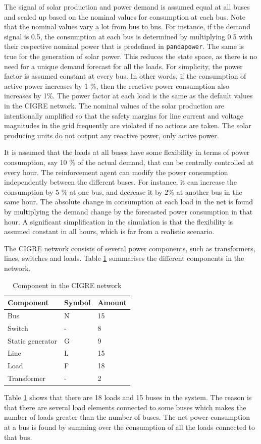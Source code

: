 \documentclass[class=book, crop=false, 11pt]{standalone}
\begin{document}
The signal of solar production and power demand is assumed equal at all buses and scaled up based on the nominal values for consumption at each bus. Note that the nominal values vary a lot from bus to bus. For instance, if the demand signal is 0.5, the consumption at each bus is determined by multiplying 0.5 with their respective nominal power that is predefined in \texttt{pandapower}. The same is true for the generation of solar power. This reduces the state space, as there is no need for a unique demand forecast for all the loads.  For simplicity, the power factor is assumed constant at every bus. In other words, if the consumption of active power increases by 1 \%, then the reactive power consumption also increases by 1\%. The power factor at each load is the same as the default values in the CIGRE network. The nominal values of the solar production are intentionally amplified so that the safety margins for line current and voltage magnitudes in the grid frequently are violated if no actions are taken. The solar producing units do not output any reactive power, only active power.

It is assumed that the loads at all buses have some flexibility in terms of power consumption, say 10 \% of the actual demand, that can be centrally controlled at every hour. The reinforcement agent can modify the power consumption independently between the different buses. For instance, it can increase the consumption by 5 \% at one bus, and decrease it by 2\% at another bus in the same hour. The absolute change in consumption at each load in the net is found by multiplying the demand change by the forecasted power consumption in that hour. A significant simplification in the simulation is that the flexibility is assumed constant in all hours, which is far from a realistic scenario. 

The CIGRE network consists of several power components, such as transformers, lines, switches and loads. Table \ref{table:cigre_components} summarises the different components in the network. 

\begin{table}[ht]
\centering
\caption{Component in the CIGRE network}
\label{table:cigre_components}
\begin{tabular}{l|ll}

Component  & Symbol & Amount 
\\ 
\hline
Bus & N & 15 \\
Switch & - & 8 \\
Static generator & G & 9 \\ 
Line & L & 15 \\
Load & F & 18 \\
Transformer &- & 2

 \\
\hline
\end{tabular}
\end{table}
Table \ref{table:cigre_components} shows that there are 18 loads and 15 buses in the system. The reason is that there are several load elements connected to some buses which makes the number of loads greater than the number of buses. The net power consumption at a bus is found by summing over the consumption of all the loads connected to that bus. 
\end{document}
